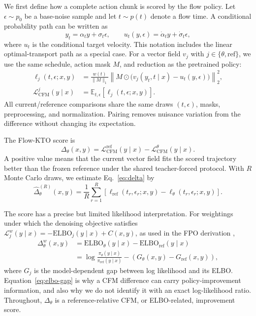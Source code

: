 \documentclass[10pt]{article}
\newcommand{\E}{\mathbb{E}}
\newcommand{\Lcfm}{\mathcal{L}_{\mathrm{CFM}}}
\begin{document}
We first define how a complete action chunk is scored by the flow policy. Let
$\epsilon\sim p_0$ be a base-noise sample and let $t\sim p(t)$ denote a flow
time. A conditional probability path can be written as
\begin{equation}
    y_t=\alpha_t y+\sigma_t\epsilon,
    \qquad
    u_t(y,\epsilon)=\dot{\alpha}_t y+\dot{\sigma}_t\epsilon,
    \label{eq:path}
\end{equation}
where $u_t$ is the conditional target velocity. This notation includes the
linear optimal-transport path as a special case. For a vector field $v_j$ with
$j\in\{\theta,\mathrm{ref}\}$, we use the same schedule, action mask $M$, and
reduction as the pretrained policy:
\begin{align}
    \ell_j(t,\epsilon;x,y)
    &=\frac{w(t)}{\lVert M\rVert_1}
      \left\lVert
      M\odot\bigl(v_j(y_t,t\mid x)-u_t(y,\epsilon)\bigr)
      \right\rVert_2^2, \\
    \Lcfm^{j}(y\mid x)
    &=\E_{t,\epsilon}\left[\ell_j(t,\epsilon;x,y)\right].
    \label{eq:cfm}
\end{align}
All current/reference comparisons share the same draws $(t,\epsilon)$, masks,
preprocessing, and normalization. Pairing removes nuisance variation from the
difference without changing its expectation.

The Flow-KTO score is
\begin{equation}
    \Delta_\theta(x,y)
    =\Lcfm^{\mathrm{ref}}(y\mid x)
     -\Lcfm^{\theta}(y\mid x).
    \label{eq:delta}
\end{equation}
A positive value means that the current vector field fits the scored trajectory
better than the frozen reference under the shared teacher-forced protocol. With
$R$ Monte Carlo draws, we estimate Eq.~\eqref{eq:delta} by
\begin{equation}
    \widehat{\Delta}^{(R)}_\theta(x,y)
    =\frac{1}{R}\sum_{r=1}^{R}
      \left[\ell_{\mathrm{ref}}(t_r,\epsilon_r;x,y)
      -\ell_\theta(t_r,\epsilon_r;x,y)\right].
    \label{eq:delta-mc}
\end{equation}

The score has a precise but limited likelihood interpretation. For weightings
under which the denoising objective satisfies
$\mathcal{L}^{w}_{j}(y\mid x)=-\mathrm{ELBO}_{j}(y\mid x)+C(x,y)$,
as used in the FPO derivation \cite{mcallister2025fpo},
\begin{align}
    \Delta^w_\theta(x,y)
    &=\mathrm{ELBO}_{\theta}(y\mid x)
      -\mathrm{ELBO}_{\mathrm{ref}}(y\mid x) \\
    &=\log\frac{\pi_\theta(y\mid x)}
                      {\pi_{\mathrm{ref}}(y\mid x)}
      -\left(G_\theta(x,y)-G_{\mathrm{ref}}(x,y)\right),
    \label{eq:elbo-gap}
\end{align}
where $G_j$ is the model-dependent gap between log likelihood and its ELBO.
Equation~\eqref{eq:elbo-gap} is why a CFM difference can carry policy-improvement
information, and also why we do not identify it with an exact log-likelihood
ratio. Throughout, $\Delta_\theta$ is a reference-relative CFM, or
ELBO-related, improvement score.
\end{document}
